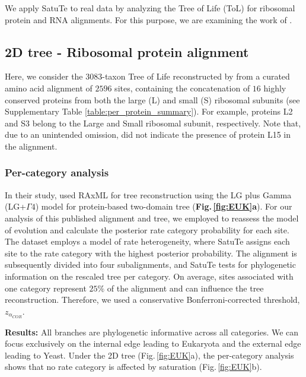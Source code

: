 \begin{appendices}
We apply SatuTe to real data by analyzing the Tree of Life (ToL) for ribosomal protein and RNA alignments.  For this purpose, we are examining the work of .

\subsection{2D tree - Ribosomal protein alignment}
Here, we consider the $3083$-taxon Tree of Life reconstructed by  from a curated amino acid alignment of $2596$ sites, containing the concatenation of $16$ highly conserved proteins from both the large  (L) and small (S) ribosomal subunits (see Supplementary Table \ref{table:per_protein_summary}). For example, proteins L2 and S3 belong to the Large and Small ribosomal subunit, respectively. Note that, due to an unintended omission,   did
not indicate the presence of protein L15 in the alignment.

\bigskip

\subsubsection{Per-category analysis}\label{suppsec:2DT_per_category_analysis}

In their study,  used RAxML  for tree reconstruction using the LG plus Gamma (LG+$\Gamma 4$) model  for protein-based two-domain tree (\textbf{Fig.\,\ref{fig:EUK}a}). For our analysis of this published alignment and tree, we employed   to reassess the model of evolution and calculate the posterior rate category probability for each site. The dataset employs a model of rate heterogeneity, where SatuTe assigns each site to the rate category with the highest posterior probability. The alignment is subsequently divided into four subalignments, and SatuTe tests for phylogenetic information on the rescaled tree per category. On average, sites associated with one category represent $25\%$ of the alignment and can  influence the tree reconstruction. Therefore, we used a conservative Bonferroni-corrected threshold, $z_{\alpha_{COR}}$. 

\medskip

\noindent \textbf{Results:} All branches are phylogenetic informative across all
categories. We can focus exclusively on the internal edge leading to Eukaryota and the external edge leading to Yeast. Under the 2D tree (Fig.\,\ref{fig:EUK}a), the per-category analysis shows that no rate category is affected by saturation (Fig.\,\ref{fig:EUK}b).


\end{appendices}
